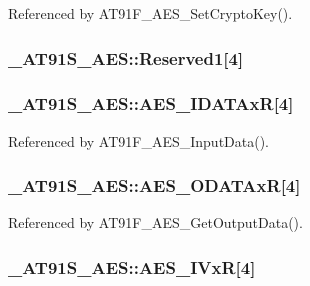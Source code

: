 Referenced by AT91F\_\-AES\_\-SetCryptoKey().\hypertarget{struct__AT91S__AES_38cd57de3b6876915902d00038ce97cd}{
\subsubsection{ {\bf \_\-AT91S\_\-AES::Reserved1}\mbox{[}4\mbox{]}}}
\label{struct__AT91S__AES_38cd57de3b6876915902d00038ce97cd}


\hypertarget{struct__AT91S__AES_e8dd530691ad5f7e714c06d4f7af5acc}{
\subsubsection{ {\bf \_\-AT91S\_\-AES::AES\_\-IDATAxR}\mbox{[}4\mbox{]}}}
\label{struct__AT91S__AES_e8dd530691ad5f7e714c06d4f7af5acc}




Referenced by AT91F\_\-AES\_\-InputData().\hypertarget{struct__AT91S__AES_374ca2ec7cf58f4d3ca190f86924f139}{
\subsubsection{ {\bf \_\-AT91S\_\-AES::AES\_\-ODATAxR}\mbox{[}4\mbox{]}}}
\label{struct__AT91S__AES_374ca2ec7cf58f4d3ca190f86924f139}




Referenced by AT91F\_\-AES\_\-GetOutputData().\hypertarget{struct__AT91S__AES_82221ae818d4923e49bc69a1dfd1a0a8}{
\subsubsection{ {\bf \_\-AT91S\_\-AES::AES\_\-IVxR}\mbox{[}4\mbox{]}}}
\label{struct__AT91S__AES_82221ae818d4923e49bc69a1dfd1a0a8}




